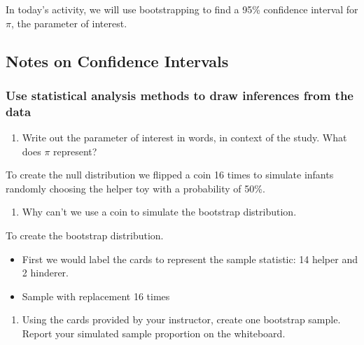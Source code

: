 \documentclass[
]{report}
\providecommand{\tightlist}{%
  \setlength{\itemsep}{0pt}\setlength{\parskip}{0pt}}
\begin{document}
In today's activity, we will use bootstrapping to find a 95\% confidence interval for \(\pi\), the parameter of interest.

\subsection*{Notes on Confidence Intervals}\label{notes-on-confidence-intervals}

\vspace{2in}

\subsubsection*{Use statistical analysis methods to draw inferences from the data}\label{use-statistical-analysis-methods-to-draw-inferences-from-the-data-1}

\begin{enumerate}
\def\labelenumi{\arabic{enumi}.}
\setcounter{enumi}{2}
\tightlist
\item
  Write out the parameter of interest in words, in context of the study. What does \(\pi\) represent?
\end{enumerate}

\vspace{0.5in}

To create the null distribution we flipped a coin 16 times to simulate infants randomly choosing the helper toy with a probability of 50\%.

\begin{enumerate}
\def\labelenumi{\arabic{enumi}.}
\setcounter{enumi}{3}
\tightlist
\item
  Why can't we use a coin to simulate the bootstrap distribution.
\end{enumerate}

\vspace{0.7in}

To create the bootstrap distribution.

\begin{itemize}
\item
  First we would label the cards to represent the sample statistic: 14 helper and 2 hinderer.
\item
  Sample with replacement 16 times
\end{itemize}

\begin{enumerate}
\def\labelenumi{\arabic{enumi}.}
\setcounter{enumi}{4}
\tightlist
\item
  Using the cards provided by your instructor, create one bootstrap sample. Report your simulated sample proportion on the whiteboard.
\end{enumerate}
\end{document}
